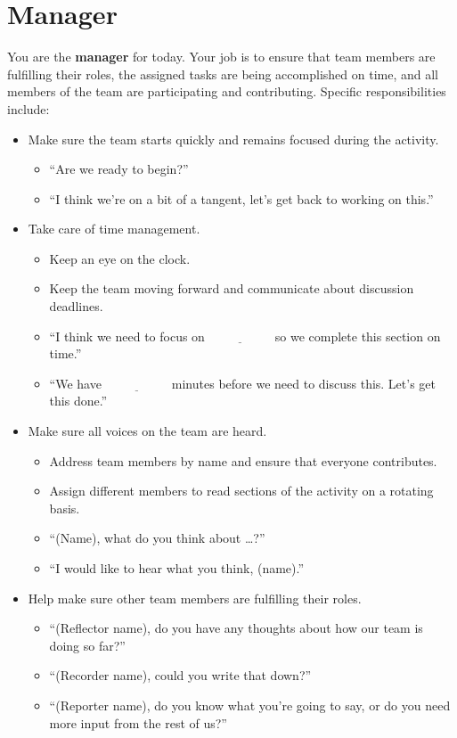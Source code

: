 \documentclass[12pt]{article}
\newcommand{\blank}{\ensuremath{\underline{\phantom{XXXXXX}}}\xspace}
\begin{document}
\section*{Manager}

You are the \textbf{manager} for today.  Your job is to ensure that
team members are fulfilling their roles, the assigned tasks are being
accomplished on time, and all members of the team are participating
and contributing. Specific responsibilities include:

\begin{itemize}
\item Make sure the team starts quickly and remains focused during the
  activity.
  \begin{itemize}
  \item ``Are we ready to begin?''
  \item ``I think we're on a bit of a tangent, let's get back to
    working on this.''
  \end{itemize}
\item Take care of time management.
  \begin{itemize}
  \item Keep an eye on the clock.
  \item Keep the team moving forward and communicate about discussion
    deadlines.
  \item ``I think we need to focus on \blank so we complete this
    section on time.''
  \item ``We have \blank minutes before we need to discuss this. Let's
    get this done.''
  \end{itemize}
\item Make sure	all voices on the team are heard.
  \begin{itemize}
  \item Address team members by name and ensure that everyone
    contributes.
  \item Assign different members to read sections of the activity on a
    rotating basis.
  \item ``(Name), what do you think about \dots?''
  \item ``I would like to hear what you think, (name).''
  \end{itemize}
\item Help make sure other team members are fulfilling their roles.
  \begin{itemize}
  \item ``(Reflector name), do you have any thoughts about how our
    team is doing so far?''
  \item ``(Recorder name), could you write that down?''
  \item ``(Reporter name), do you know what you're going to say, or do
    you need more input from the rest of us?''
  \end{itemize}
\end{itemize}
\end{document}
